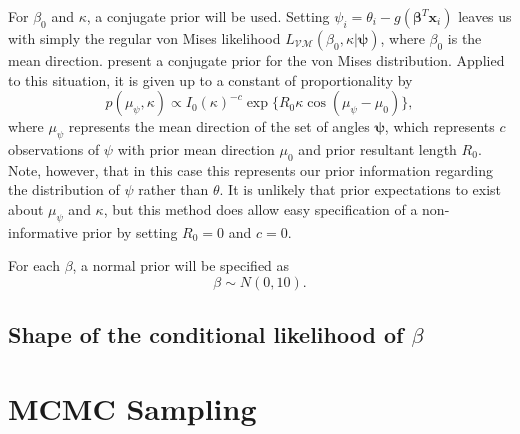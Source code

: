 \documentclass[12pt,a4paper]{article}
\begin{document}
For $\beta_0$ and $\kappa$, a conjugate prior will be used. Setting $\psi_i = \theta_i - g(\boldsymbol\beta^T \boldsymbol{x}_i)$ leaves us with simply the regular von Mises likelihood $L_{\mathcal{VM}}(\beta_0, \kappa \vert \boldsymbol\psi)$, where $\beta_0$ is the mean direction. \citet{guttorp1988finding} present a conjugate prior for the von Mises distribution. Applied to this situation, it is given up to a constant of proportionality by 
\begin{equation}
p(\mu_{\psi}, \kappa) \propto  I_0 (\kappa) ^{-c} \exp\{R_0 \kappa \cos (\mu_{\psi} - \mu_0)\},
\end{equation}
where $\mu_{\psi}$ represents the mean direction of the set of angles $\boldsymbol\psi$,  which represents $c$ observations of $\psi$ with prior mean direction $\mu_0$ and prior resultant length $R_0$. Note, however, that in this case this represents our prior information regarding the distribution of $\psi$ rather than $\theta$. It is unlikely that prior expectations to exist about $\mu_{\psi}$ and $\kappa$, but this method does allow easy specification of a non-informative prior by setting $R_0 = 0$ and $c = 0$. 

For each $\beta$, a normal prior will be specified as 
\begin{equation}
\beta \sim N(0, 10).
\end{equation}


\subsection{Shape of the conditional likelihood of $\beta$}




\section{MCMC Sampling}
\end{document}
